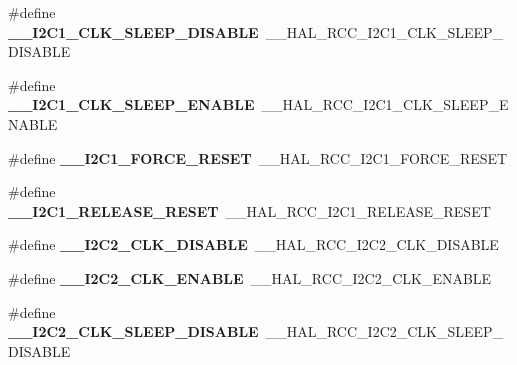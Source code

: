 \begin{DoxyCompactItemize}
\item 
\mbox{\label{group___h_a_l___r_c_c___aliased_ga7bbdc41f3b1b13f8fe2a9c090050ed7f}} 
\#define {\bfseries \+\_\+\+\_\+\+I2\+C1\+\_\+\+C\+L\+K\+\_\+\+S\+L\+E\+E\+P\+\_\+\+D\+I\+S\+A\+B\+LE}~\+\_\+\+\_\+\+H\+A\+L\+\_\+\+R\+C\+C\+\_\+\+I2\+C1\+\_\+\+C\+L\+K\+\_\+\+S\+L\+E\+E\+P\+\_\+\+D\+I\+S\+A\+B\+LE
\item 
\mbox{\label{group___h_a_l___r_c_c___aliased_gae34832665142d53a98bf833c9f9558b8}} 
\#define {\bfseries \+\_\+\+\_\+\+I2\+C1\+\_\+\+C\+L\+K\+\_\+\+S\+L\+E\+E\+P\+\_\+\+E\+N\+A\+B\+LE}~\+\_\+\+\_\+\+H\+A\+L\+\_\+\+R\+C\+C\+\_\+\+I2\+C1\+\_\+\+C\+L\+K\+\_\+\+S\+L\+E\+E\+P\+\_\+\+E\+N\+A\+B\+LE
\item 
\mbox{\label{group___h_a_l___r_c_c___aliased_gae84da6d623ad78feba69961ea4f776bf}} 
\#define {\bfseries \+\_\+\+\_\+\+I2\+C1\+\_\+\+F\+O\+R\+C\+E\+\_\+\+R\+E\+S\+ET}~\+\_\+\+\_\+\+H\+A\+L\+\_\+\+R\+C\+C\+\_\+\+I2\+C1\+\_\+\+F\+O\+R\+C\+E\+\_\+\+R\+E\+S\+ET
\item 
\mbox{\label{group___h_a_l___r_c_c___aliased_gae58af756d3706dcb17376b4674e70ed8}} 
\#define {\bfseries \+\_\+\+\_\+\+I2\+C1\+\_\+\+R\+E\+L\+E\+A\+S\+E\+\_\+\+R\+E\+S\+ET}~\+\_\+\+\_\+\+H\+A\+L\+\_\+\+R\+C\+C\+\_\+\+I2\+C1\+\_\+\+R\+E\+L\+E\+A\+S\+E\+\_\+\+R\+E\+S\+ET
\item 
\mbox{\label{group___h_a_l___r_c_c___aliased_ga4035dd0ee6f7b6386fd8531181786c97}} 
\#define {\bfseries \+\_\+\+\_\+\+I2\+C2\+\_\+\+C\+L\+K\+\_\+\+D\+I\+S\+A\+B\+LE}~\+\_\+\+\_\+\+H\+A\+L\+\_\+\+R\+C\+C\+\_\+\+I2\+C2\+\_\+\+C\+L\+K\+\_\+\+D\+I\+S\+A\+B\+LE
\item 
\mbox{\label{group___h_a_l___r_c_c___aliased_ga5cef079b7e35da960f9871a7d1ed1816}} 
\#define {\bfseries \+\_\+\+\_\+\+I2\+C2\+\_\+\+C\+L\+K\+\_\+\+E\+N\+A\+B\+LE}~\+\_\+\+\_\+\+H\+A\+L\+\_\+\+R\+C\+C\+\_\+\+I2\+C2\+\_\+\+C\+L\+K\+\_\+\+E\+N\+A\+B\+LE
\item 
\mbox{\label{group___h_a_l___r_c_c___aliased_ga9433bf9082b7128475bf4a4073bcdca1}} 
\#define {\bfseries \+\_\+\+\_\+\+I2\+C2\+\_\+\+C\+L\+K\+\_\+\+S\+L\+E\+E\+P\+\_\+\+D\+I\+S\+A\+B\+LE}~\+\_\+\+\_\+\+H\+A\+L\+\_\+\+R\+C\+C\+\_\+\+I2\+C2\+\_\+\+C\+L\+K\+\_\+\+S\+L\+E\+E\+P\+\_\+\+D\+I\+S\+A\+B\+LE

\end{DoxyCompactItemize}
